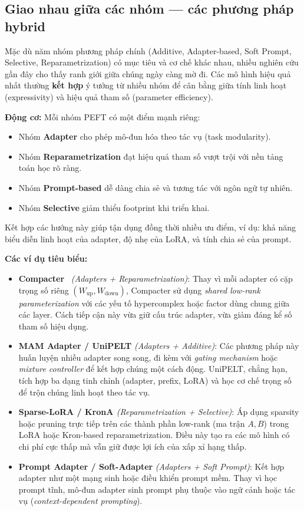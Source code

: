 \subsection{Giao nhau giữa các nhóm — các phương pháp hybrid}
\label{ssec:hybrid}

Mặc dù năm nhóm phương pháp chính (Additive, Adapter-based, Soft Prompt, Selective, Reparametrization) có mục tiêu và cơ chế khác nhau, nhiều nghiên cứu gần đây cho thấy ranh giới giữa chúng ngày càng mờ đi.  
Các mô hình hiệu quả nhất thường \textbf{kết hợp} ý tưởng từ nhiều nhóm để cân bằng giữa tính linh hoạt (expressivity) và hiệu quả tham số (parameter efficiency).

\textbf{Động cơ:}  
Mỗi nhóm PEFT có một điểm mạnh riêng:
\begin{itemize}
	\item Nhóm \textbf{Adapter} cho phép mô-đun hóa theo tác vụ (task modularity).
	\item Nhóm \textbf{Reparametrization} đạt hiệu quả tham số vượt trội với nền tảng toán học rõ ràng.
	\item Nhóm \textbf{Prompt-based} dễ dàng chia sẻ và tương tác với ngôn ngữ tự nhiên.
	\item Nhóm \textbf{Selective} giảm thiểu footprint khi triển khai.
\end{itemize}
Kết hợp các hướng này giúp tận dụng đồng thời nhiều ưu điểm, ví dụ: khả năng biểu diễn linh hoạt của adapter, độ nhẹ của LoRA, và tính chia sẻ của prompt.

\textbf{Các ví dụ tiêu biểu:}
\begin{itemize}
	\item \textbf{Compacter}~\cite{mahabadi2021compacter} \textit{(Adapters + Reparametrization)}:  
	Thay vì mỗi adapter có cặp trọng số riêng $(W_{\text{up}}, W_{\text{down}})$, Compacter sử dụng \emph{shared low-rank parameterization} với các yếu tố hypercomplex hoặc factor dùng chung giữa các layer.  
	Cách tiếp cận này vừa giữ cấu trúc adapter, vừa giảm đáng kể số tham số hiệu dụng.
	
	\item \textbf{MAM Adapter / UniPELT\cite{ma2022unipelt}} \textit{(Adapters + Additive)}:  
	Các phương pháp này huấn luyện nhiều adapter song song, đi kèm với \emph{gating mechanism} hoặc \emph{mixture controller} để kết hợp chúng một cách động.  
	UniPELT, chẳng hạn, tích hợp ba dạng tinh chỉnh (adapter, prefix, LoRA) và học cơ chế trọng số để trộn chúng linh hoạt theo tác vụ.
	
	\item \textbf{Sparse-LoRA / KronA \cite{buczak2023krona}} \textit{(Reparametrization + Selective)}:
	Áp dụng sparsity hoặc pruning trực tiếp trên các thành phần low-rank (ma trận $A,B$) trong LoRA hoặc Kron-based reparametrization.  
	Điều này tạo ra các mô hình có chi phí cực thấp mà vẫn giữ được lợi ích của xấp xỉ hạng thấp.
	
	\item \textbf{Prompt Adapter / Soft-Adapter} \textit{(Adapters + Soft Prompt)}:
	Kết hợp adapter như một mạng sinh hoặc điều khiển prompt mềm.
	Thay vì học prompt tĩnh, mô-đun adapter sinh prompt phụ thuộc vào ngữ cảnh hoặc tác vụ (\textit{context-dependent prompting}).
\end{itemize}

